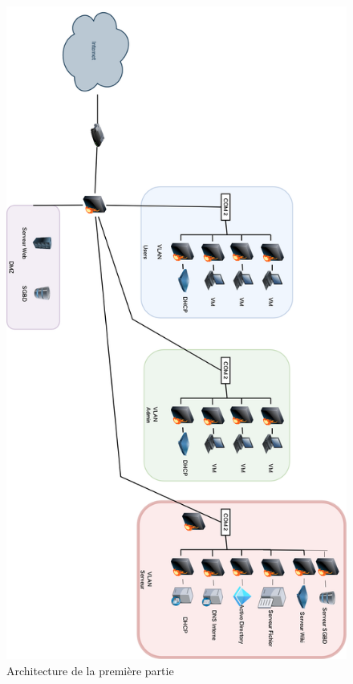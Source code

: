 \documentclass[file.tex]{subfiles}
\begin{document}
\begin{figure}[H]
    \centering
    \includegraphics[width=1\textwidth]{Images/Architecrue.png}
    \caption{Architecture de la première partie}
    \label{fig:solution1}
\end{figure}
\end{document}
